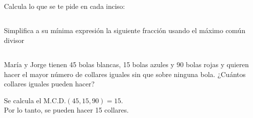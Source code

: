\documentclass[12pt,addpoints,answers]{evalua}
\begin{document}
\begin{questions}
    \subsection*{\else{}\fi}
    \question[4] Calcula lo que se te pide en cada inciso:

    \subsection*{\else{}\fi}
    \question[4] Simplifica a su mínima expresión la siguiente fracción usando el máximo común divisor
    \begin{multicols}{2}
    \end{multicols}

    \subsection*{\else{}\fi}

    \question[6] María y Jorge tienen 45 bolas blancas, 15 bolas azules y 90 bolas rojas y quieren hacer el mayor número de collares iguales sin que sobre ninguna bola. ¿Cuántos collares iguales pueden hacer?
    \begin{solutionbox}{4cm}
        Se calcula el M.C.D.$(45,15,90) = 15$.\\
        Por lo tanto, se pueden hacer 15 collares.
    \end{solutionbox}
    \newpage

\end{questions}
\end{document}
